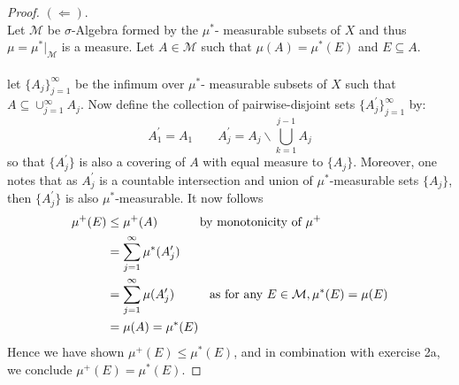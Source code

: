\documentclass[nocolor]{report}
\begin{document}
\begin{proof}$(\Leftarrow)$. \\
    Let $\mathcal{M}$ be $\sigma$-Algebra formed by the $\mu^*$- measurable subsets of $X$ and thus $\mu = \mu^*|_{\mathcal{M}}$ is a measure. Let $A\in \mathcal{M}$ such that $\mu(A) = \mu^*(E)$ and $E\subseteq A$. \\
    \\
    let $\{A_j\}_{j=1}^{\infty}$ be the infimum over $\mu^*$- measurable subsets of $X$ such that $A\subseteq \cup_{j=1}^{\infty}A_j$. Now define the collection of pairwise-disjoint sets $\{A^\prime_j\}^{\infty}_{j=1}$ by:
    $$A^\prime_1 = A_1 \quad \quad A^\prime_j = A_j \backslash \bigcup_{k=1}^{j-1}A_j$$
    so that $\{A_j^\prime\}$ is also a covering of $A$ with equal measure to $\{A_j\}$. Moreover, one notes that as $A^\prime_j$ is a countable intersection and union of $\mu^*$-measurable sets $\{A_j\}$, then $\{A^\prime_j\}$ is also $\mu^*$-measurable. It now follows 
    \begin{align*}
        \mu^+(E) & \leq \mu^+(A) \hspace{12mm} \text{by monotonicity of } \mu^+ \\
        &= \sum_{j=1}^{\infty}\mu^*(A_j^\prime) \\
        &= \sum_{j=1}^{\infty}\mu(A_j^\prime) \hspace{10mm} \text{as for any } E\in\mathcal{M}, \mu^*(E) = \mu(E) \\
        &= \mu(A) = \mu^*(E)
    \end{align*}
    Hence we have shown $\mu^+(E)\leq\mu^*(E)$, and in combination with exercise 2a, we conclude $\mu^+(E) = \mu^*(E)$.
\end{proof}
\end{document}
